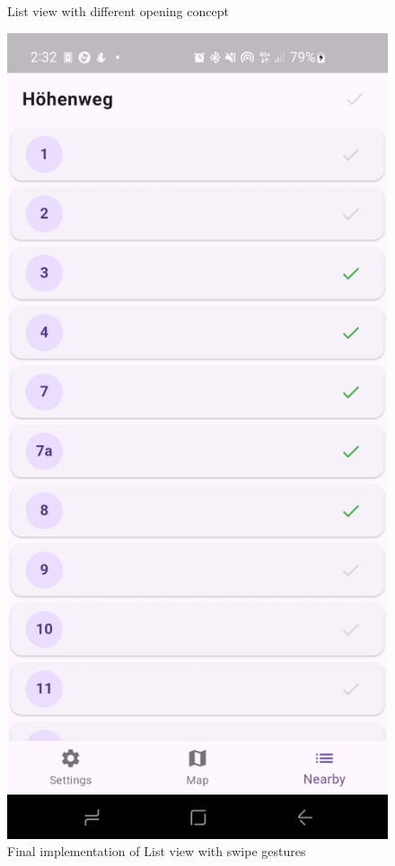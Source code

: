 \begin{figure}[H]
\begin{minipage}{0.26\textwidth}
        \caption{List view with different opening concept}
    \end{minipage}
    \hspace{0.3cm}
    \begin{minipage}{0.26\textwidth}
        \centering
        \includegraphics[width=\textwidth]{images/paul/wireframes/finalList.jpeg}
        \caption{Final implementation of List view with swipe gestures}
    \end{minipage}
\end{figure}

